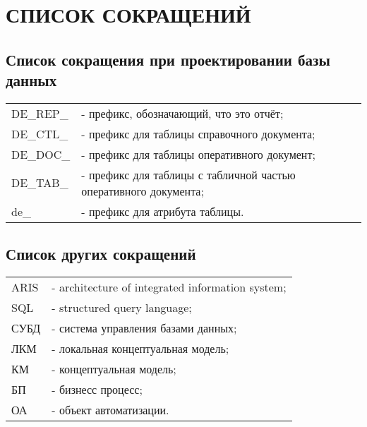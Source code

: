 {}
\section*{СПИСОК СОКРАЩЕНИЙ}

{}
\subsection*{Список сокращения при проектировании базы данных}

\begin{tabular}{p{2cm}l}
    DE\_REP\_   & - префикс, обозначающий, что это отчёт; \\
    DE\_CTL\_   & - префикс для таблицы справочного документа; \\
    DE\_DOC\_   & - префикс для таблицы оперативного документ; \\
    DE\_TAB\_   & - префикс для таблицы с табличной частью оперативного документа; \\
    de\_        & - префикс для атрибута таблицы. \\
\end{tabular}

{}
\subsection*{Список других сокращений}

\begin{tabular}{p{2cm}l}
    ARIS    & - architecture of integrated information system;\\
    SQL     & - structured query language;\\
    СУБД    & - система управления базами данных; \\
    ЛКМ     & - локальная концептуальная модель;\\ 
    КМ      & - концептуальная модель;\\
    БП      & - бизнесс процесс;\\
    ОА      & - объект автоматизации.\\
\end{tabular}

\newpage
